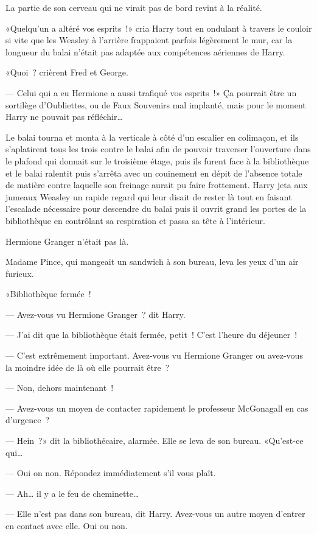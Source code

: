 La partie de son cerveau qui ne virait pas de bord revint à la réalité.

«Quelqu'un a altéré vos esprits~!» cria Harry tout en ondulant à travers le couloir si vite que les Weasley à l'arrière frappaient parfois légèrement le mur, car la longueur du balai n'était pas adaptée aux compétences aériennes de Harry.

«Quoi~? crièrent Fred et George.

--- Celui qui a eu Hermione a aussi trafiqué vos esprits~!» Ça pourrait être un sortilège d'Oubliettes, ou de Faux Souvenirs mal implanté, mais pour le moment Harry ne pouvait pas réfléchir…

Le balai tourna et monta à la verticale à côté d'un escalier en colimaçon, et ils s'aplatirent tous les trois contre le balai afin de pouvoir traverser l'ouverture dans le plafond qui donnait sur le troisième étage, puis ils furent face à la bibliothèque et le balai ralentit puis s'arrêta avec un couinement en dépit de l'absence totale de matière contre laquelle son freinage aurait pu faire frottement. Harry jeta aux jumeaux Weasley un rapide regard qui leur disait de rester là tout en faisant l'escalade nécessaire pour descendre du balai puis il ouvrit grand les portes de la bibliothèque en contrôlant sa respiration et passa sa tête à l'intérieur.

Hermione Granger n'était pas là.

Madame Pince, qui mangeait un sandwich à son bureau, leva les yeux d'un air furieux.

«Bibliothèque fermée~!

--- Avez-vous vu Hermione Granger~? dit Harry.

--- J'ai dit que la bibliothèque était fermée, petit~! C'est l'heure du déjeuner~!

--- C'est extrêmement important. Avez-vous vu Hermione Granger ou avez-vous la moindre idée de là où elle pourrait être~?

--- Non, dehors maintenant~!

--- Avez-vous un moyen de contacter rapidement le professeur McGonagall en cas d'urgence~?

--- Hein~?» dit la bibliothécaire, alarmée. Elle se leva de son bureau. «Qu'est-ce qui…

--- Oui on non. Répondez immédiatement s'il vous plaît.

--- Ah… il y a le feu de cheminette…

--- Elle n'est pas dans son bureau, dit Harry. Avez-vous un autre moyen d'entrer en contact avec elle. Oui ou non.

